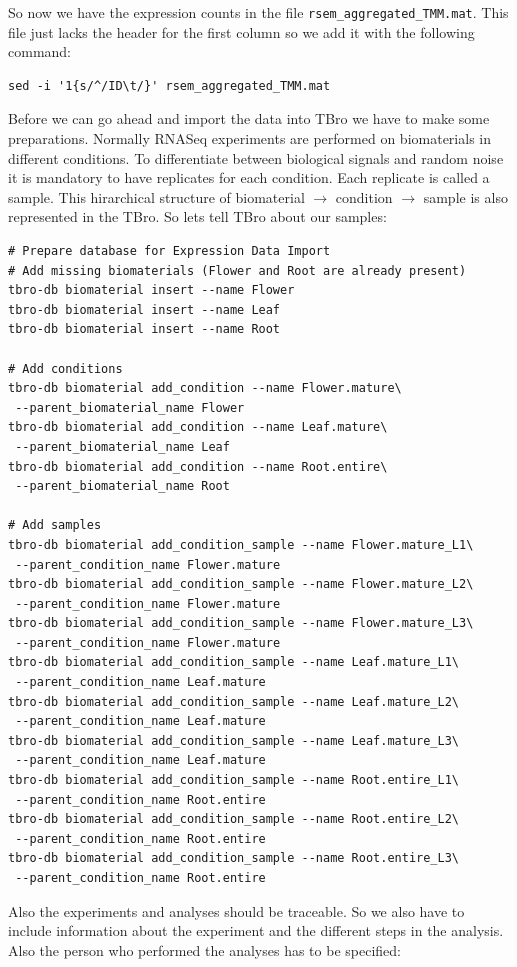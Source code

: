 \documentclass[english]{scrartcl}
\begin{document}
So now we have the expression counts in the file
\texttt{rsem\_aggregated\_TMM.mat}. This file just lacks the header for the
first column so we add it with the following command:
\begin{lstlisting}
sed -i '1{s/^/ID\t/}' rsem_aggregated_TMM.mat
\end{lstlisting}

Before we can go ahead and import the data into TBro we have to make some
preparations. Normally RNASeq experiments are performed on biomaterials in
different conditions. To differentiate between biological signals and random
noise it is mandatory to have replicates for each condition. Each replicate is
called a sample. This hirarchical structure of biomaterial $\rightarrow$
condition $\rightarrow$ sample is also represented in the TBro. So lets tell
TBro about our samples:

\begin{lstlisting}
# Prepare database for Expression Data Import
# Add missing biomaterials (Flower and Root are already present)
tbro-db biomaterial insert --name Flower
tbro-db biomaterial insert --name Leaf
tbro-db biomaterial insert --name Root

# Add conditions
tbro-db biomaterial add_condition --name Flower.mature\
 --parent_biomaterial_name Flower
tbro-db biomaterial add_condition --name Leaf.mature\
 --parent_biomaterial_name Leaf
tbro-db biomaterial add_condition --name Root.entire\
 --parent_biomaterial_name Root

# Add samples
tbro-db biomaterial add_condition_sample --name Flower.mature_L1\
 --parent_condition_name Flower.mature
tbro-db biomaterial add_condition_sample --name Flower.mature_L2\
 --parent_condition_name Flower.mature
tbro-db biomaterial add_condition_sample --name Flower.mature_L3\
 --parent_condition_name Flower.mature
tbro-db biomaterial add_condition_sample --name Leaf.mature_L1\
 --parent_condition_name Leaf.mature
tbro-db biomaterial add_condition_sample --name Leaf.mature_L2\
 --parent_condition_name Leaf.mature
tbro-db biomaterial add_condition_sample --name Leaf.mature_L3\
 --parent_condition_name Leaf.mature
tbro-db biomaterial add_condition_sample --name Root.entire_L1\
 --parent_condition_name Root.entire
tbro-db biomaterial add_condition_sample --name Root.entire_L2\
 --parent_condition_name Root.entire
tbro-db biomaterial add_condition_sample --name Root.entire_L3\
 --parent_condition_name Root.entire
\end{lstlisting}

Also the experiments and analyses should be traceable. So we also have to
include information about the experiment and the different steps in the
analysis. Also the person who performed the analyses has to be specified:
\end{document}
